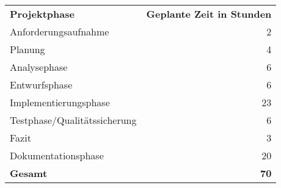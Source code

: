 \begin{tabular}{lr}
\rowcolor{heading}\textbf{Projektphase} & \textbf{Geplante Zeit in Stunden} \\
Anforderungsaufnahme & 2 \\
\rowcolor{odd}Planung & 4 \\
Analysephase & 6 \\
\rowcolor{odd}Entwurfsphase & 6 \\
Implementierungsphase & 23 \\
\rowcolor{odd}Testphase/Qualitätssicherung & 6 \\
Fazit & 3 \\
\rowcolor{odd}Dokumentationsphase & 20 \\
\hline
\hline
\rowcolor{odd}\textbf{Gesamt} & \textbf{70} \\
\end{tabular}
